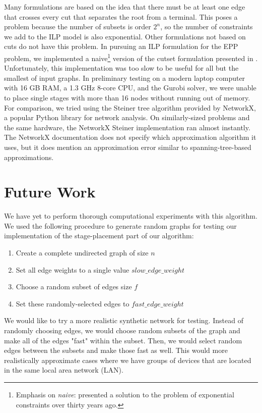 \documentclass{article}
\begin{document}
 	Many formulations are based on the idea that there must be at least one edge that crosses every cut that separates the root from a terminal. This poses a problem because the number of subsets is order $2^n$, so the number of constraints we add to the ILP model is also exponential. Other formulations not based on cuts do not have this problem. In pursuing an ILP formulation for the EPP problem, we implemented a naive\footnote{Emphasis on \textit{naive}: \cite{Aneja1980AnIL} presented a solution to the problem of exponential constraints over thirty years ago.}  version of the cutset formulation presented in \cite{Koch1998SolvingST}. Unfortunately, this implementation was too slow to be useful for all but the smallest of input graphs. In preliminary testing on a modern laptop computer with 16 GB RAM, a 1.3 GHz 8-core CPU, and the Gurobi solver, we were unable to place single stages with more than 16 nodes without running out of memory. For comparison, we tried using the Steiner tree algorithm provided by NetworkX, a popular Python library for network analysis\cite{networkx}. On similarly-sized problems and the same hardware, the NetworkX Steiner implementation ran almost instantly. The NetworkX documentation does not specify which approximation algorithm it uses, but it does mention an approximation error similar to spanning-tree-based approximations.
 	
 	\section{Future Work}
 	We have yet to perform thorough computational experiments with this algorithm. We used the following procedure to generate random graphs for testing our implementation of the stage-placement part of our algorithm:
 	\begin{enumerate}
 		\item Create a complete undirected graph of size $n$
 		\item Set all edge weights to a single value $slow\_edge\_weight$
 		\item Choose a random subset of edges size $f$
 		\item Set these randomly-selected edges to $fast\_edge\_weight$
 	\end{enumerate}
 	
 	We would like to try a more realistic synthetic network for testing. Instead of randomly choosing edges, we would choose random subsets of the graph and make all of the edges "fast" within the subset. Then, we would select random edges between the subsets and make those fast as well. This would more realistically approximate cases where we have groups of devices that are located in the same local area network (LAN).
 	
\end{document}

